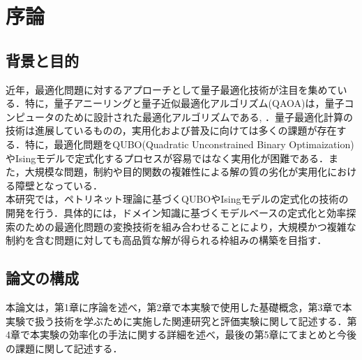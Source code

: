 \chapter{序論}
\label{chap:introduction}


\section{背景と目的}
近年，最適化問題に対するアプローチとして量子最適化技術が注目を集めている．特に，量子アニーリングと量子近似最適化アルゴリズム(QAOA)は，量子コンピュータのために設計された最適化アルゴリズムである\cite{qaoa}, \cite{quantum_annealing}．量子最適化計算の技術は進展しているものの，実用化および普及に向けては多くの課題が存在する．特に，最適化問題をQUBO(Quadratic Unconstrained Binary Optimaization)やIsingモデルで定式化するプロセスが容易ではなく実用化が困難である．また，大規模な問題，制約や目的関数の複雑性による解の質の劣化が実用化における障壁となっている．\\
本研究では，ペトリネット理論に基づくQUBOやIsingモデルの定式化の技術の開発を行う．具体的には，ドメイン知識に基づくモデルベースの定式化と効率探索のための最適化問題の変換技術を組み合わせることにより，大規模かつ複雑な制約を含む問題に対しても高品質な解が得られる枠組みの構築を目指す．
\section{論文の構成}
本論文は，第1章に序論を述べ，第2章で本実験で使用した基礎概念，第3章で本実験で扱う技術を学ぶために実施した関連研究と評価実験に関して記述する．第4章で本実験の効率化の手法に関する詳細を述べ，最後の第5章にてまとめと今後の課題に関して記述する．
